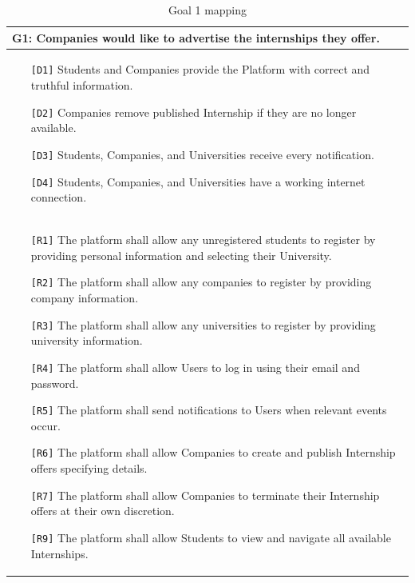 \begin{table}[H]
    \centering
    \begin{tabular}{|p{15cm}|}
         \hline
        \textbf{G1:} Companies would like to advertise the internships they offer. \\ \hline
        \begin{itemize}
            \item[\texttt{[D1]}] Students and Companies provide the Platform with correct and truthful information.
            \item[\texttt{[D2]}] Companies remove published Internship if they are no longer available.
            \item[\texttt{[D3]}] Students, Companies, and Universities receive every notification.
            \item[\texttt{[D4]}] Students, Companies, and Universities have a working internet connection.
        \end{itemize} \\ \hline
        \begin{itemize}
            \item[\texttt{[R1]}] The platform shall allow any unregistered students to register by providing personal information and selecting their University.
            \item[\texttt{[R2]}] The platform shall allow any companies to register by providing company information.
            \item[\texttt{[R3]}] The platform shall allow any universities to register by providing university information.
            \item[\texttt{[R4]}] The platform shall allow Users to log in using their email and password.
            \item[\texttt{[R5]}] The platform shall send notifications to Users when relevant events occur.
            \item[\texttt{[R6]}] The platform shall allow Companies to create and publish Internship offers specifying details.
            \item[\texttt{[R7]}] The platform shall allow Companies to terminate their Internship offers at their own discretion.
            \item[\texttt{[R9]}] The platform shall allow Students to view and navigate all available Internships.
        \end{itemize} \\ \hline
    \end{tabular}
    \caption{Goal 1 mapping}
    \label{tab:G1}
\end{table}

